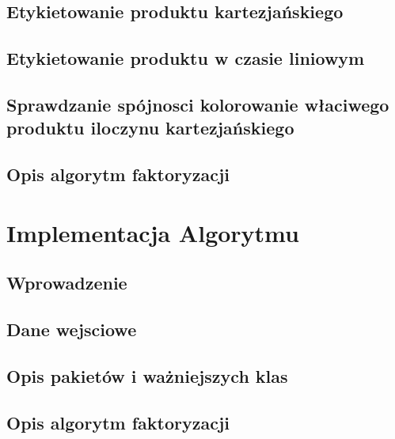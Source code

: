\documentclass[12pt,a4paper,titlepage]{article}
\begin{document}
\subsection{Etykietowanie produktu kartezjańskiego}
\subsection{Etykietowanie produktu w czasie liniowym}
\subsection{Sprawdzanie spójnosci kolorowanie właciwego produktu iloczynu kartezjańskiego}
\subsection{Opis algorytm faktoryzacji}
\section{Implementacja Algorytmu}
\subsection{Wprowadzenie}
\subsection{Dane wejsciowe}
\subsection{Opis pakietów i ważniejszych  klas}
\subsection{Opis algorytm faktoryzacji}
\end{document}
